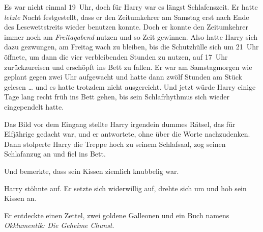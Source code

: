 Es war nicht einmal 19~Uhr, doch für Harry war es längst Schlafenszeit. Er hatte \emph{letzte} Nacht festgestellt, dass er den Zeitumkehrer am Samstag erst nach Ende des Lesewettstreits wieder benutzen konnte. Doch er konnte den Zeitumkehrer immer noch am \emph{Freitagabend} nutzen und so Zeit gewinnen. Also hatte Harry sich dazu gezwungen, am Freitag wach zu bleiben, bis die Schutzhülle sich um 21~Uhr öffnete, um dann die vier verbleibenden Stunden zu nutzen, auf 17~Uhr zurückzureisen und erschöpft ins Bett zu fallen. Er war am Samstagmorgen wie geplant gegen zwei Uhr aufgewacht und hatte dann zwölf Stunden am Stück gelesen … und es hatte trotzdem nicht ausgereicht. Und jetzt würde Harry einige Tage lang recht früh ins Bett gehen, bis sein Schlafrhythmus sich wieder eingependelt hatte.

Das Bild vor dem Eingang stellte Harry irgendein dummes Rätsel, das für Elfjährige gedacht war, und er antwortete, ohne über die Worte nachzudenken. Dann stolperte Harry die Treppe hoch zu seinem Schlafsaal, zog seinen Schlafanzug an und fiel ins Bett.

Und bemerkte, dass sein Kissen ziemlich knubbelig war.

Harry stöhnte auf. Er setzte sich widerwillig auf, drehte sich um und hob sein Kissen an.

Er entdeckte einen Zettel, zwei goldene Galleonen und ein Buch namens \emph{Okklumentik: Die Geheime Chunst}.%

